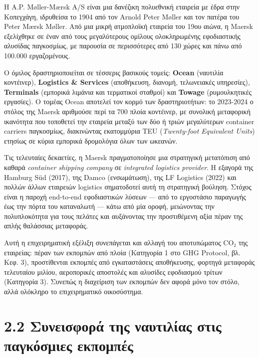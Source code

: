 Η A.P. Møller-Mærsk A/S είναι μια δανέζικη πολυεθνική εταιρεία με έδρα
στην Κοπεγχάγη, ιδρυθείσα το 1904 από τον Arnold Peter Møller και τον
πατέρα του Peter Mærsk Møller. Από μια μικρή ατμοπλοϊκή εταιρεία του
19ου αιώνα, η Maersk εξελίχθηκε σε έναν από τους μεγαλύτερους ομίλους
ολοκληρωμένης εφοδιαστικής αλυσίδας παγκοσμίως, με παρουσία σε
περισσότερες από 130 χώρες και πάνω από 100.000 εργαζομένους.

Ο όμιλος δραστηριοποιείται σε τέσσερις βασικούς τομείς: \textbf{Ocean}
(ναυτιλία κοντέινερ), \textbf{Logistics \& Services} (αποθήκευση,
διανομή, τελωνειακές υπηρεσίες), \textbf{Terminals} (εμπορικά λιμάνια
και τερματικοί σταθμοί) και \textbf{Towage} (ρυμουλκητικές εργασίες). Ο
τομέας Ocean αποτελεί τον κορμό των δραστηριοτήτων: το 2023-2024 ο
στόλος της Maersk αριθμούσε περί τα 700 πλοία κοντέινερ, με συνολική
μεταφορική ικανότητα που τοποθετεί την εταιρεία μεταξύ των δύο ή τριών
μεγαλύτερων container carriers παγκοσμίως, διακινώντας εκατομμύρια TEU
(\emph{Twenty-foot Equivalent Units}) ετησίως σε κύρια εμπορικά
δρομολόγια όλων των ωκεανών.

Τις τελευταίες δεκαετίες, η Maersk πραγματοποίησε μια στρατηγική
μετατόπιση από καθαρά \emph{container shipping company} σε
\emph{integrated logistics provider}. Η εξαγορά της Hamburg Süd (2017),
της Damco (ενσωμάτωση), της LF Logistics (2022) και πολλών άλλων
εταιρειών logistics σηματοδοτεί αυτή τη στρατηγική βούληση. Στόχος είναι
η παροχή end-to-end εφοδιαστικών λύσεων --- από το εργοστάσιο παραγωγής
έως την πόρτα του καταναλωτή --- κάτω από μία οροφή, μειώνοντας την
πολυπλοκότητα για τους πελάτες και αυξάνοντας την προστιθέμενη αξία
πέραν της απλής θαλάσσιας μεταφοράς.

Αυτή η επιχειρηματική εξέλιξη συνεπάγεται και αλλαγή του αποτυπώματος
CO₂ της εταιρείας: πέραν των εκπομπών από πλοία (Κατηγορία 1 στο GHG
Protocol, βλ. Κεφ. 3), προστίθενται εκπομπές από εγκαταστάσεις
αποθήκευσης, φορτηγά μεταφοράς τελευταίου μιλίου, αεροπορικές αποστολές
και αλυσίδες εφοδιασμού τρίτων (Κατηγορία 3). Συνεπώς η διαχείριση των
εκπομπών δεν αφορά μόνο τον στόλο, αλλά ολόκληρο το επιχειρηματικό
οικοσύστημα.

\section{2.2 Συνεισφορά της ναυτιλίας στις παγκόσμιες
εκπομπές}\label{ux3c3ux3c5ux3bdux3b5ux3b9ux3c3ux3c6ux3bfux3c1ux3ac-ux3c4ux3b7ux3c2-ux3bdux3b1ux3c5ux3c4ux3b9ux3bbux3afux3b1ux3c2-ux3c3ux3c4ux3b9ux3c2-ux3c0ux3b1ux3b3ux3baux3ccux3c3ux3bcux3b9ux3b5ux3c2-ux3b5ux3baux3c0ux3bfux3bcux3c0ux3adux3c2}

